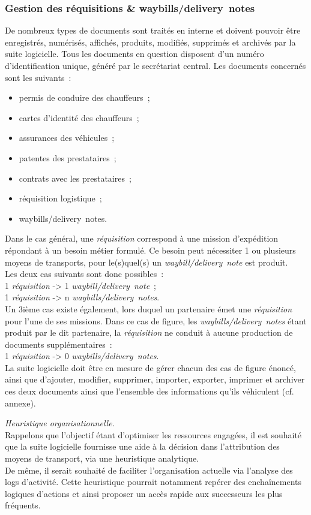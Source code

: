 \subsubsection{Gestion des réquisitions \& waybills/delivery~notes}
De nombreux types de documents sont traités en interne et doivent pouvoir être enregistrés, numérisés, affichés, produits, modifiés, supprimés et archivés par la suite logicielle. Tous les documents en question disposent d'un numéro d'identification unique, généré par le secrétariat central. Les documents concernés sont les suivants~:
\begin{itemize}
	\item permis de conduire des chauffeurs~;
	\item cartes d'identité des chauffeurs~;
	\item assurances des véhicules~;
	\item patentes des prestataires~;
	\item contrats avec les prestataires~;
	\item réquisition logistique~;
	\item waybills/delivery~notes.
\end{itemize}
Dans le cas général, une \emph{réquisition} correspond à une mission d'expédition répondant à un besoin métier formulé. Ce besoin peut nécessiter 1 ou plusieurs moyens de transports, pour le(s)quel(s) un \emph{waybill/delivery~note} est produit.
\\
Les deux cas suivants sont donc possibles~:
\\
1 \emph{réquisition} -> 1 \emph{waybill/delivery~note}~;
\\
1 \emph{réquisition} -> n \emph{waybills/delivery~notes}.
\\
Un 3ième cas existe également, lors duquel un partenaire émet une \emph{réquisition} pour l'une de ses missions. Dans ce cas de figure, les \emph{waybills/delivery~notes} étant produit par le dit partenaire, la \emph{réquisition} ne conduit à aucune production de documents supplémentaires~:
\\
1 \emph{réquisition} -> 0 \emph{waybills/delivery~notes}.
\\
La suite logicielle doit être en mesure de gérer chacun des cas de figure énoncé, ainsi que d'ajouter, modifier, supprimer, importer, exporter, imprimer et archiver ces deux documents ainsi que l'ensemble des informations qu'ils véhiculent (cf. annexe).
\begin{notation}
	\emph{Heuristique organisationnelle.}
	\\
	Rappelons que l'objectif étant d'optimiser les ressources engagées, il est souhaité que la suite logicielle fournisse une aide à la décision dans l'attribution des moyens de transport, via une heuristique analytique.
	\\
	De même, il serait souhaité de faciliter l'organisation actuelle via l'analyse des logs d'activité. Cette heuristique pourrait notamment repérer des enchaînements logiques d'actions et ainsi proposer un accès rapide aux successeurs les plus fréquents.
\end{notation}

